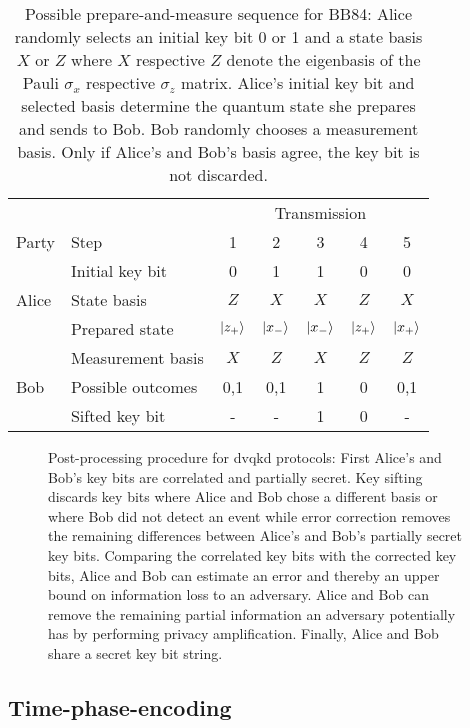 \begin{table}[htb]
	\centering
	\begin{tabular}{llccccc}
		\toprule
		& & \multicolumn{5}{c}{Transmission} \\
		\cmidrule{3-7}
		Party & Step & 1 & 2 & 3 & 4 & 5 \\ 
		\midrule
		\multirow{3}{*}{Alice} & Initial key bit & \num{0} & \num{1} & \num{1} & \num{0} & \num{0} \\
		& State basis & $Z$ & $X$ & $X$ & $Z$ & $X$ \\
		& Prepared state & $\ket{z_+}$ & $\ket{x_-}$ & $\ket{x_-}$ & $\ket{z_+}$ & $\ket{x_+}$ \\
		\cmidrule{1-1}
		\multirow{3}{*}{Bob} & Measurement basis & $X$ & $Z$ & $X$ & $Z$ & $Z$ \\
		& Possible outcomes & \num{0},\num{1} & \num{0},\num{1} & \num{1} & \num{0} & \num{0},\num{1} \\
		& Sifted key bit & - & - & 1 & 0 & - \\
		\bottomrule
	\end{tabular}
	\caption{Possible prepare-and-measure sequence for BB84: Alice randomly selects an initial key bit \num{0} or \num{1} and a state basis $X$ or $Z$ where $X$ respective $Z$ denote the eigenbasis of the Pauli $\sigma_x$ respective $\sigma_z$ matrix. Alice's initial key bit and selected basis determine the quantum state she prepares and sends to Bob. Bob randomly chooses a measurement basis. Only if Alice's and Bob's basis agree, the key bit is not discarded.}
\end{table}
\begin{figure}[htb]
	\centering
	
	\caption{Post-processing procedure for \gls{dvqkd} protocols: First Alice's and Bob's key bits are correlated and partially secret. Key sifting discards key bits where Alice and Bob chose a different basis or where Bob did not detect an event while error correction removes the remaining differences between Alice's and Bob's partially secret key bits. Comparing the correlated key bits with the corrected key bits, Alice and Bob can estimate an error and thereby an upper bound on information loss to an adversary. Alice and Bob can remove the remaining partial information an adversary potentially has by performing privacy amplification. Finally, Alice and Bob share a secret key bit string.}
\end{figure}

\FloatBarrier
\subsection{Time-phase-encoding}

